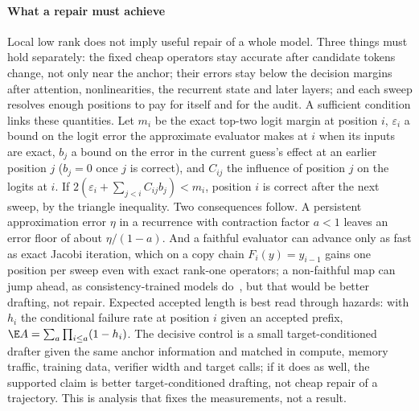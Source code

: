 \paragraph{What a repair must achieve}\label{sec:repair-analysis}
Local low rank does not imply useful repair of a whole model. Three things must hold separately: the fixed cheap operators stay accurate after candidate tokens change, not only near the anchor; their errors stay below the decision margins after attention, nonlinearities, the recurrent state and later layers; and each sweep resolves enough positions to pay for itself and for the audit. A sufficient condition links these quantities. Let $m_i$ be the exact top-two logit margin at position $i$, $\varepsilon_i$ a bound on the logit error the approximate evaluator makes at $i$ when its inputs are exact, $b_j$ a bound on the error in the current guess's effect at an earlier position $j$ ($b_j=0$ once $j$ is correct), and $C_{ij}$ the influence of position $j$ on the logits at $i$. If $2(\varepsilon_i+\sum_{j<i}C_{ij}b_j)<m_i$, position $i$ is correct after the next sweep, by the triangle inequality. Two consequences follow. A persistent approximation error $\eta$ in a recurrence with contraction factor $a<1$ leaves an error floor of about $\eta/(1-a)$. And a faithful evaluator can advance only as fast as exact Jacobi iteration, which on a copy chain $F_i(y)=y_{i-1}$ gains one position per sweep even with exact rank-one operators; a non-faithful map can jump ahead, as consistency-trained models do~\cite{cllm}, but that would be better drafting, not repair. Expected accepted length is best read through hazards: with $h_i$ the conditional failure rate at position $i$ given an accepted prefix, $\E A=\sum_a\prod_{i\le a}(1-h_i)$. The decisive control is a small target-conditioned drafter given the same anchor information and matched in compute, memory traffic, training data, verifier width and target calls; if it does as well, the supported claim is better target-conditioned drafting, not cheap repair of a trajectory. This is analysis that fixes the measurements, not a result.

